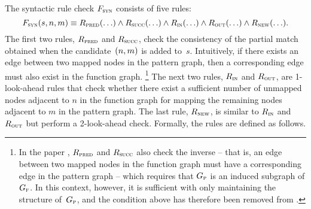 The syntactic rule check $F_{\textrm{\textsc{syn}}}$ consists of five rules:
%
\begin{equation}
  F_{\textrm{\textsc{syn}}}(s, n, m) \equiv
  R_{\textrm{\textsc{pred}}}(\ldots) \wedge R_{\textrm{\textsc{succ}}}(\ldots) \wedge
  R_{\textrm{\textsc{in}}}(\ldots) \wedge R_{\textrm{\textsc{out}}}(\ldots) \wedge R_{\textrm{\textsc{new}}}(\ldots).
\end{equation}
%
The first two rules, $R_{\textrm{\textsc{pred}}}$ and $R_{\textrm{\textsc{succ}}}$, check the consistency
of the partial \gls{match} obtained when the candidate~\mbox{$\mPair{n}{m}$} is
added to~$s$.
%
Intuitively, if there exists an \gls{edge} between two mapped \glspl{node} in
the \gls{pattern graph}, then a corresponding \gls{edge} must also exist in the
\gls{function graph}.\!%
%
\footnote{%
  In the paper \cite{CordellaEtAl:2001}, $R_{\textrm{\textsc{pred}}}$ and $R_{\textrm{\textsc{succ}}}$
  also check the inverse -- that is, an \gls{edge} between two mapped
  \glspl{node} in the \gls{function graph} must have a corresponding \gls{edge}
  in the \gls{pattern graph} -- which requires that $G_{\textrm{\textsc{p}}}$ is an induced
  \gls{subgraph} of $G_{\textrm{\textsc{f}}}$.
  In this context, however, it is sufficient with only maintaining the structure
  of~$G_{\textrm{\textsc{p}}}$, and the condition above has therefore been removed from
  .
}
%
The next two rules, $R_{\textrm{\textsc{in}}}$ and $R_{\textrm{\textsc{out}}}$, are \num{1}-look-ahead
rules that check whether there exist a sufficient number of unmapped
\glspl{node} adjacent to $n$ in the \gls{function graph} for mapping the
remaining \glspl{node} adjacent to $m$ in the \gls{pattern graph}.
%
The last rule, $R_{\textrm{\textsc{new}}}$, is similar to $R_{\textrm{\textsc{in}}}$ and $R_{\textrm{\textsc{out}}}$
but perform a \num{2}-look-ahead check.
%
Formally, the rules are defined as follows.
%

